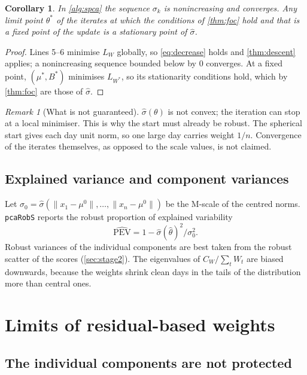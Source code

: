 \documentclass[11pt]{article}
\newtheorem{corollary}[theorem]{Corollary}
\theoremstyle{definition}
\theoremstyle{remark}
\newtheorem{remark}[theorem]{Remark}
\newcommand{\norm}[1]{\lVert #1\rVert}
\begin{document}
\begin{corollary}\label{cor:descent}
In \cref{alg:spca} the sequence $\sigma_k$ is nonincreasing and converges. Any limit point $\theta^*$ of the iterates
at which the conditions of \cref{thm:foc} hold and that is a fixed point of the update is a stationary point of $\hat\sigma$.
\end{corollary}
\begin{proof}
Lines 5--6 minimise $L_W$ globally, so \eqref{eq:decrease} holds and \cref{thm:descent} applies; a nonincreasing sequence
bounded below by $0$ converges. At a fixed point, $(\mu^*,B^*)$ minimises $L_{W^*}$, so its stationarity conditions
hold, which by \cref{thm:foc} are those of $\hat\sigma$.
\end{proof}

\begin{remark}[What is not guaranteed]
$\hat\sigma(\theta)$ is not convex; the iteration can stop at a local minimiser. This is why the start must already be
robust. The spherical start gives each day unit norm, so one large day carries weight $1/n$. Convergence of the iterates
themselves, as opposed to the scale values, is not claimed.
\end{remark}

\subsection{Explained variance and component variances}
Let $\sigma_0=\hat\sigma(\norm{x_1-\mu^0},\dots,\norm{x_n-\mu^0})$ be the M-scale of the centred norms. \texttt{pcaRobS}
reports the robust proportion of explained variability
\[
\widehat{\mathrm{PEV}}=1-\hat\sigma(\hat\theta)^2/\sigma_0^2 .
\]
Robust variances of the individual components are best taken from the robust scatter of the scores
(\cref{sec:stage2}). The eigenvalues of $C_W/\sum_tW_t$ are biased downwards, because the weights shrink clean days in the tails of the
distribution more than central ones.

\section{Limits of residual-based weights}\label{sec:inspan}

\subsection{The individual components are not protected}
\end{document}
